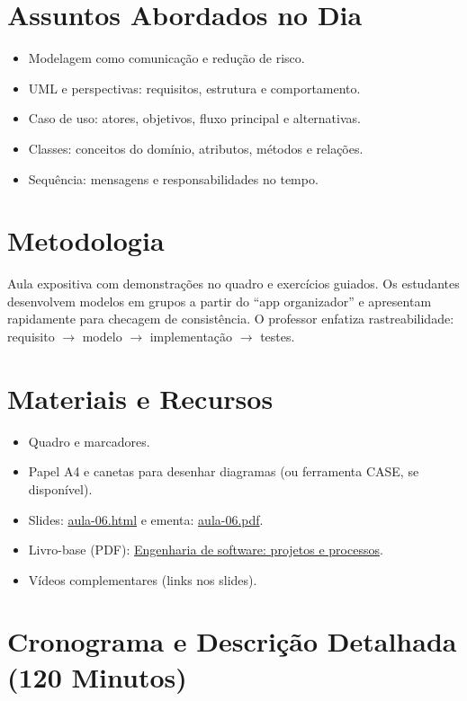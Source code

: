 \documentclass[12pt,a4paper]{article}
\begin{document}
\section{Assuntos Abordados no Dia}
\begin{itemize}[leftmargin=*,itemsep=0.25em]
  \item Modelagem como comunicação e redução de risco.
  \item UML e perspectivas: requisitos, estrutura e comportamento.
  \item Caso de uso: atores, objetivos, fluxo principal e alternativas.
  \item Classes: conceitos do domínio, atributos, métodos e relações.
  \item Sequência: mensagens e responsabilidades no tempo.
\end{itemize}

\section{Metodologia}
Aula expositiva com demonstrações no quadro e exercícios guiados. Os estudantes desenvolvem modelos em grupos a partir do ``app organizador'' e apresentam rapidamente para checagem de consistência. O professor enfatiza rastreabilidade: requisito $\rightarrow$ modelo $\rightarrow$ implementação $\rightarrow$ testes.

\section{Materiais e Recursos}
\begin{itemize}[leftmargin=*,itemsep=0.25em]
  \item Quadro e marcadores.
  \item Papel A4 e canetas para desenhar diagramas (ou ferramenta CASE, se disponível).
  \item Slides: \href{aula-06.html}{aula-06.html} e ementa: \href{aula-06.pdf}{aula-06.pdf}.
  \item Livro-base (PDF): \href{../99-Materiais/Engenharia%20de%20software%20projetos%20e%20processos%20by%20Wilson%20de%20P%C3%A1dua%20Paula%20Filho%20.epub.pdf}{Engenharia de software: projetos e processos}.
  \item Vídeos complementares (links nos slides).
\end{itemize}

\section{Cronograma e Descrição Detalhada (120 Minutos)}
\end{document}
